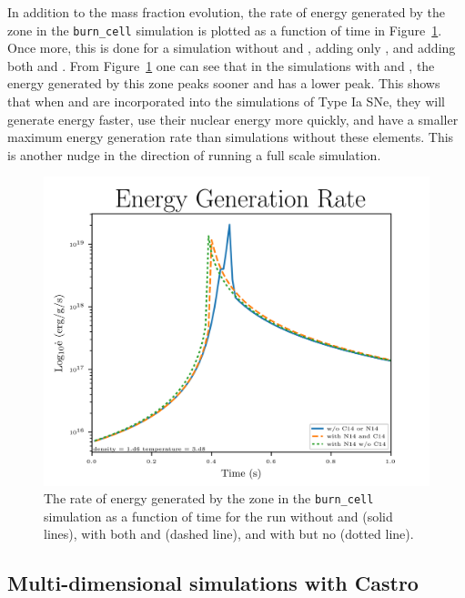 \documentclass[preprint]{aastex62}
\begin{document}
      In addition to the mass fraction evolution, the rate of energy generated by the zone in the {\tt burn\_cell} simulation is plotted as a function of time in Figure~\ref{fig:energygeneration}. Once more, this is done for a simulation without  and , adding only , and adding both  and . From Figure~\ref{fig:energygeneration} one can see that in the simulations with  and , the energy generated by this zone peaks sooner and has a lower peak.  This shows that when  and  are incorporated into the simulations of Type Ia SNe, they will generate energy faster, use their nuclear energy more quickly, and have a smaller maximum energy generation rate than simulations without these elements. This is another nudge in the direction of running a full scale simulation. 
      
      \begin{figure}
        \centering
        \includegraphics[width=5in]{images/subch_nC14nN14_edot_tol-10.png}
        \caption{The rate of energy generated by the zone in the {\tt burn\_cell} simulation as a function of time for the run without  and  (solid lines), with both  and  (dashed line), and with  but no  (dotted line).
          }
        \label{fig:energygeneration}
      \end{figure} 

  
  \subsection{Multi-dimensional simulations with Castro}
  
\end{document}
